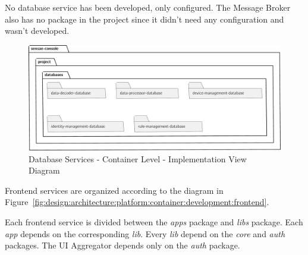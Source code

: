 No database service has been developed, only configured. The Message Broker also has no package in the project since it didn't need any configuration and wasn't developed.

\begin{figure}[H]
   \centering
   \includegraphics[page=1,width=\columnwidth]{assets/diagrams/design/architectural/level2/development/database.pdf}
   \caption[Database Services - Container Level - Implementation View Diagram]{Database Services - Container Level - Implementation View Diagram}
   \label{fig:design:architecture:platform:container:development:database}
\end{figure}

Frontend services are organized according to the diagram in Figure~\ref{fig:design:architecture:platform:container:development:frontend}.

Each frontend service is divided between the \textit{apps} package and \textit{libs} package. Each \textit{app} depends on the corresponding \textit{lib}. Every \textit{lib} depend on the \textit{core} and \textit{auth} packages. The UI Aggregator depends only on the \textit{auth} package.

